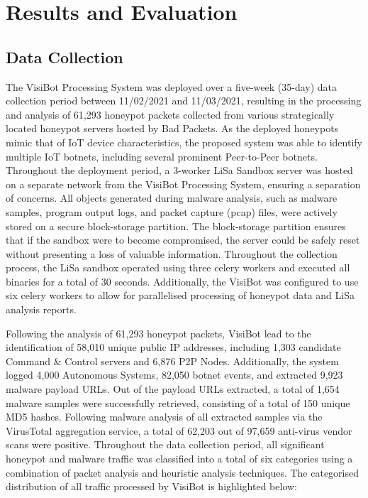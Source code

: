 
\chapter{Results and Evaluation}

\section{Data Collection}

The VisiBot Processing System was deployed over a five-week (35-day) data collection period between 11/02/2021 and 11/03/2021, resulting in the processing and analysis of 61,293 honeypot packets collected from various strategically located honeypot servers hosted by Bad Packets. As the deployed honeypots mimic that of IoT device characteristics, the proposed system was able to identify multiple IoT botnets, including several prominent Peer-to-Peer botnets. Throughout the deployment period, a 3-worker LiSa Sandbox server was hosted on a separate network from the VisiBot Processing System, ensuring a separation of concerns. All objects generated during malware analysis, such as malware samples, program output logs, and packet capture (pcap) files, were actively stored on a secure block-storage partition. The block-storage partition ensures that if the sandbox were to become compromised, the server could be safely reset without presenting a loss of valuable information. Throughout the collection process, the LiSa sandbox operated using three celery workers and executed all binaries for a total of 30 seconds. Additionally, the VisiBot was configured to use six celery workers to allow for parallelised processing of honeypot data and LiSa analysis reports.

Following the analysis of 61,293 honeypot packets, VisiBot lead to the identification of 58,010 unique public IP addresses, including 1,303 candidate Command \& Control servers and 6,876 P2P Nodes. Additionally, the system logged 4,000 Autonomous Systems, 82,050 botnet events, and extracted 9,923 malware payload URLs. Out of the payload URLs extracted, a total of 1,654 malware samples were successfully retrieved, consisting of a total of 150 unique MD5 hashes. Following malware analysis of all extracted samples via the VirusTotal aggregation service, a total of 62,203 out of 97,659 anti-virus vendor scans were positive. Throughout the data collection period, all significant honeypot and malware traffic was classified into a total of six categories using a combination of packet analysis and heuristic analysis techniques. The categorised distribution of all traffic processed by VisiBot is highlighted below: 

